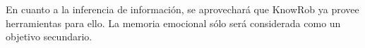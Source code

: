 En cuanto a la inferencia de informaci\'on, se aprovechar\'a que KnowRob ya provee herramientas para ello. La memoria emocional s\'olo ser\'a considerada como un objetivo secundario.








